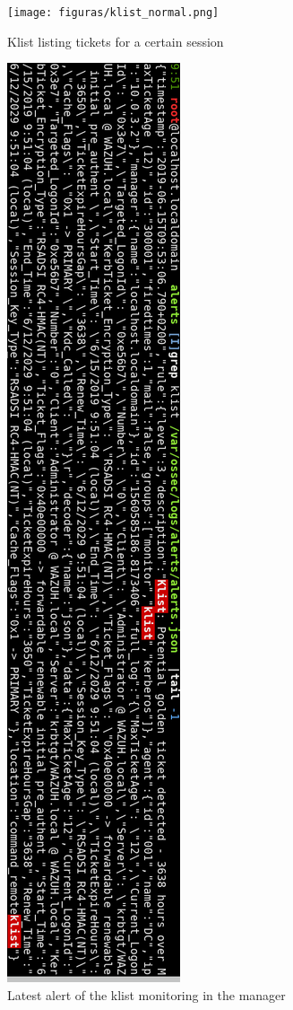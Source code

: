\begin{figure}[H]
	\centering
	\texttt{[image: figuras/klist\_normal.png]}
	\caption{Klist listing tickets for a certain session}
\end{figure}
\begin{figure}[H]
	\centering
	\includegraphics[height=\textheight]{figuras/klist_alert_rotated.png}
	\caption{Latest alert of the klist monitoring in the manager}
\end{figure}
